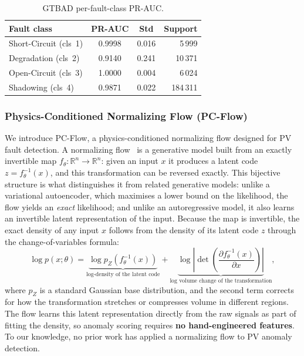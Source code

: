 \begin{table}[H]
\centering
\caption{GTBAD per-fault-class PR-AUC.\label{tab:gtbad-per-class}}
\begin{tabular}{lccr}
\toprule
\textbf{Fault class} & \textbf{PR-AUC} & \textbf{Std} & \textbf{Support} \\
\midrule
Short-Circuit (cls~1) & 0.9998 & 0.016 & 5\,999 \\
Degradation   (cls~2) & 0.9140 & 0.241 & 10\,371 \\
Open-Circuit  (cls~3) & 1.0000 & 0.004 & 6\,024 \\
Shadowing     (cls~4) & 0.9871 & 0.022 & 184\,311 \\
\bottomrule
\end{tabular}
\end{table}

\subsubsection{Physics-Conditioned Normalizing Flow (PC-Flow)}\label{sec:ad-pcflow}

We introduce PC-Flow, a physics-conditioned normalizing flow designed for PV fault detection. A normalizing flow~\citep{rezende2015variational} is a generative model built from an exactly invertible map $f_\theta : \mathbb{R}^n \to \mathbb{R}^n$: given an input $x$ it produces a latent code $z = f_\theta^{-1}(x)$, and this transformation can be reversed exactly. This bijective structure is what distinguishes it from related generative models: unlike a variational autoencoder, which maximises a lower bound on the likelihood, the flow yields an \emph{exact} likelihood; and unlike an autoregressive model, it also learns an invertible latent representation of the input. Because the map is invertible, the exact density of any input $x$ follows from the density of its latent code $z$ through the change-of-variables formula:
\begin{equation}
    \log p(x;\theta) = \underbrace{\log p_Z(f_\theta^{-1}(x))}_{\text{log-density of the latent code}} + \underbrace{\log\left|\det\!\left(\frac{\partial f_\theta^{-1}(x)}{\partial x}\right)\right|}_{\text{log volume change of the transformation}},
\end{equation}
where $p_Z$ is a standard Gaussian base distribution, and the second term corrects for how the transformation stretches or compresses volume in different regions. The flow learns this latent representation directly from the raw signals as part of fitting the density, so anomaly scoring requires \textbf{no hand-engineered features}. To our knowledge, no prior work has applied a normalizing flow to PV anomaly detection.

